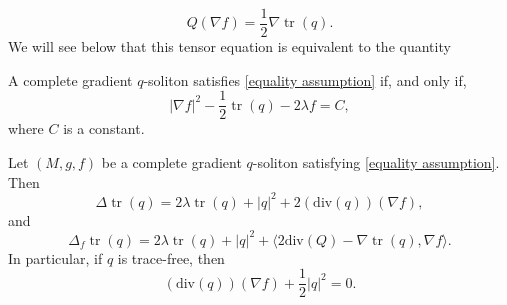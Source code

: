 \documentclass[10pt,a4paper]{amsart}
\begin{document}
 \begin{equation}\label{equality assumption}
     Q(\nabla f) =\frac{1}{2}\nabla  \operatorname{tr}(q).
 \end{equation}   We will see below that this tensor equation is equivalent to the quantity

\begin{proposition}\label{Hamilton identity}  A complete gradient $q$-soliton satisfies \eqref{equality assumption} if, and only if,  \begin{equation}\label{IH}
|\nabla f|^2 - \frac{1}{2}\operatorname{tr}(q)-2\lambda f=C,
\end{equation}
where $C$ is a constant.
    
\end{proposition}

\begin{lemma}\label{Laplacian of the trace}
Let $(M,g,f)$ be a complete gradient $q$-soliton satisfying \eqref{equality assumption}. Then
\begin{equation}\label{eq with trace}
\Delta \operatorname{tr}(q)=2\lambda \operatorname{tr}(q)+|q|^2+2(\mathrm{div}(q))(\nabla f),
\end{equation}
and
\begin{equation}\label{eq f-Laplac of trace}
\Delta_f \operatorname{tr}(q)=2\lambda\operatorname{tr}(q)+|q|^2+\langle 2\mathrm{div}(Q)-\nabla \operatorname{tr}(q),\nabla f\rangle.
\end{equation}
In particular, if $q$ is trace-free, then
    \begin{equation}\label{eq no trace}
        (\mathrm{div}(q))(\nabla f)+\frac{1}{2}|q|^2=0.
    \end{equation}
\end{lemma}
\end{document}
